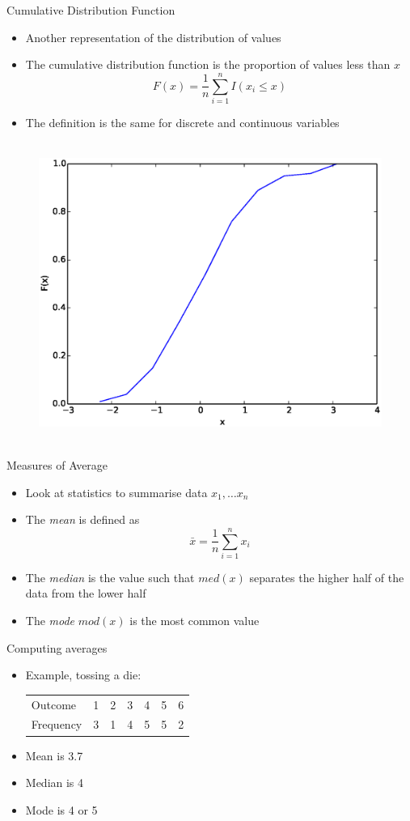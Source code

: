 \documentclass{beamer}
\begin{document}
\begin{frame}{Cumulative Distribution Function}  
\begin{itemize} 
 \item Another representation of the distribution of values 
\item The cumulative distribution function is the proportion of values less than $x$
\begin{displaymath}
 F(x) = \frac{1}{n}\sum_{i=1}^n I(x_i \leq x)
\end{displaymath}
\item The definition is the same for discrete and continuous variables 
\end{itemize}
 \begin{figure}[htp]
\mbox{
\includegraphics[width=0.5\linewidth]{ContinuousCDF.eps}
}
\end{figure} 
\end{frame}

\begin{frame}{Measures of Average}
\begin{itemize} 
 \item Look at statistics to summarise data $x_1, \ldots x_n$
  \item The \emph{mean} is defined as 
  \begin{displaymath}
   \bar{x} = \frac{1}{n}\sum_{i=1}^n x_i
  \end{displaymath}
\item The \emph{median} is the value such that $med(x)$ separates the higher half of the data from the lower half 
\item The \emph{mode} $mod(x)$ is the most common value  
\end{itemize}
\end{frame}

\begin{frame}{Computing averages} 
 \begin{itemize} 
  \item Example, tossing a die: 
\begin{table}
  \begin{tabular}{l | l l l l l l }
\hline 
  Outcome & 1 & 2 & 3 & 4 & 5 & 6 \\ 
  Frequency & 3 & 1 & 4 & 5 & 5 & 2 \\
\hline 
  \end{tabular} 
\end{table}
  \item Mean is 3.7 
  \item Median is 4 
  \item Mode is 4 or 5 
 \end{itemize}
\end{frame}
\end{document}

